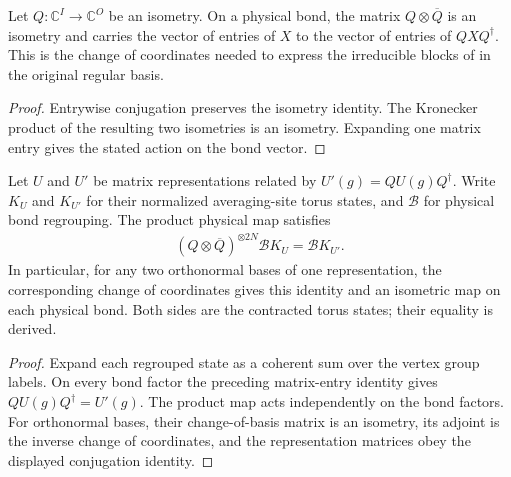\begin{lemma}%
    \label{lem:peps_bond_coordinate_transport}
    \leanok
    Let $Q:\mathbb C^I\to\mathbb C^O$ be an isometry. On a physical
    bond, the matrix $Q\otimes\overline Q$ is an isometry and carries
    the vector of entries of $X$ to the vector of entries of $QXQ^\dagger$.
    This is the change of coordinates needed to express the irreducible
    blocks of \cite[Section~7]{Schuch2010PEPS} in the original regular basis.
\end{lemma}

\begin{proof}\leanok
    Entrywise conjugation preserves the isometry identity. The Kronecker
    product of the resulting two isometries is an isometry. Expanding one
    matrix entry gives the stated action on the bond vector.
\end{proof}

\begin{lemma}%
    \label{thm:peps_torus_bond_coordinate_transport}
    \leanok
    Let $U$ and $U'$ be matrix representations related by
    $U'(g)=QU(g)Q^\dagger$. Write $K_U$ and $K_{U'}$ for their
    normalized averaging-site torus states, and $\mathcal B$ for physical
    bond regrouping. The product physical map satisfies
    \begin{align}
        (Q\otimes\overline Q)^{\otimes 2N}\mathcal B K_U
        =\mathcal B K_{U'}.
    \end{align}
    In particular, for any two orthonormal bases of one representation,
    the corresponding change of coordinates gives this identity and an
    isometric map on each physical bond. Both sides are the contracted
    torus states; their equality is derived.
\end{lemma}

\begin{proof}\leanok
    Expand each regrouped state as a coherent sum over the vertex
    group labels. On every bond factor the preceding matrix-entry identity
    gives $QU(g)Q^\dagger=U'(g)$. The product map acts independently on
    the bond factors. For orthonormal bases, their change-of-basis matrix
    is an isometry, its adjoint is the inverse change of coordinates, and
    the representation matrices obey the displayed conjugation identity.
\end{proof}
